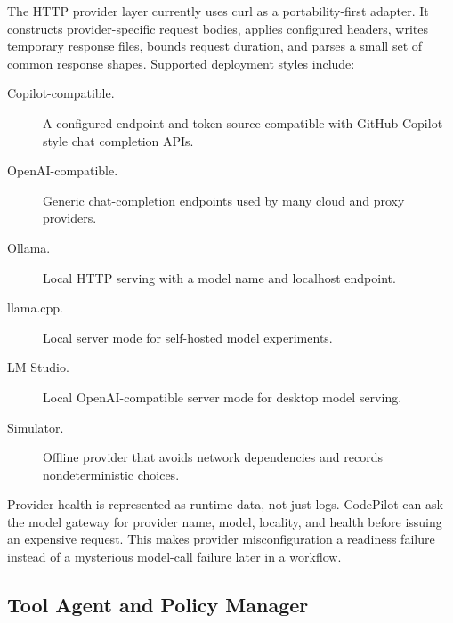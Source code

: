 \documentclass[manuscript,screen,review]{acmart}
\begin{document}
The HTTP provider layer currently uses curl as a portability-first adapter. It
constructs provider-specific request bodies, applies configured headers, writes
temporary response files, bounds request duration, and parses a small set of
common response shapes. Supported deployment styles include:

\begin{description}
  \item[Copilot-compatible.] A configured endpoint and token source compatible
  with GitHub Copilot-style chat completion APIs.
  \item[OpenAI-compatible.] Generic chat-completion endpoints used by many cloud
  and proxy providers.
  \item[Ollama.] Local HTTP serving with a model name and localhost endpoint.
  \item[llama.cpp.] Local server mode for self-hosted model experiments.
  \item[LM Studio.] Local OpenAI-compatible server mode for desktop model
  serving.
  \item[Simulator.] Offline provider that avoids network dependencies and
  records nondeterministic choices.
\end{description}

Provider health is represented as runtime data, not just logs. CodePilot can ask
the model gateway for provider name, model, locality, and health before issuing
an expensive request. This makes provider misconfiguration a readiness failure
instead of a mysterious model-call failure later in a workflow.

\subsection{Tool Agent and Policy Manager}
\end{document}
